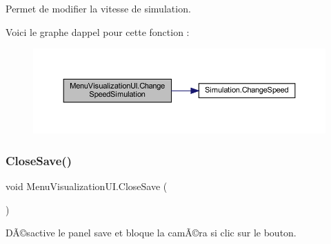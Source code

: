 Permet de modifier la vitesse de simulation. 

Voici le graphe d\textquotesingle{}appel pour cette fonction \+:\nopagebreak
\begin{figure}[H]
\begin{center}
\leavevmode
\includegraphics[width=350pt]{class_menu_visualization_u_i_abae4f4813543053bd5fc9d68ed4916d5_cgraph}
\end{center}
\end{figure}
\mbox{\label{class_menu_visualization_u_i_a262b9857eed5d1a7e749beb653a88cad}} 
\subsubsection{\texorpdfstring{Close\+Save()}{CloseSave()}}
{\footnotesize\ttfamily void Menu\+Visualization\+U\+I.\+Close\+Save (\begin{DoxyParamCaption}{ }\end{DoxyParamCaption})\hspace{0.3cm}{\ttfamily [inline]}}



DÃ©sactive le panel save et bloque la camÃ©ra si clic sur le bouton. 

